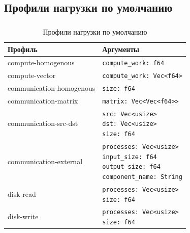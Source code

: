 \documentclass[t]{beamer}  %
\begin{document}
	\subsection{Профили нагрузки по умолчанию}\label{default-profiles}
\begin{frame}[fragile]
	\frametitle{\insertsection}
	\framesubtitle{\insertsubsection}

\begin{table}[H]
	\fontsize{9}{13}\selectfont
    \centering
    \begin{tabular}{|l|l|}
        \hline
        \textbf{Профиль} & \textbf{Аргументы} \\ 
        \hline
        compute-homogenous & \texttt{compute\_work: f64}  \\
        \hline
        compute-vector &  \texttt{compute\_work: Vec<f64>}  \\
        \hline
        communication-homogenous & \texttt{size: f64}  \\
        \hline 
        communication-matrix &  \texttt{matrix: Vec<Vec<f64>>}  \\
        \hline
        communication-src-dst & \makecell[tl]{
              \texttt{src: Vec<usize>} \\ \texttt{dst: Vec<usize>} \\ \texttt{size: f64} } \\
        \hline
        communication-external & \makecell[tl]{
             \texttt{processes: Vec<usize>}\\ \texttt{input\_size: f64}\\ \texttt{output\_size: f64}\\ \texttt{component\_name: String}} \\ 
            \hline
        disk-read & \makecell[tl]{ \texttt{processes: Vec<usize>}\\ \texttt{size: f64}} \\ 
        \hline
        disk-write & \makecell[tl]{\texttt{processes: Vec<usize>}\\\texttt{size: f64}} \\
        \hline
    \end{tabular}
    \caption*{Профили нагрузки по умолчанию}
\end{table}

\end{frame}
\end{document}
